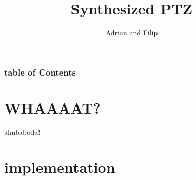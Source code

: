 \documentclass[9pt]{beamer}
\title{Synthesized PTZ}
\author{Adrian and Filip}
\begin{document}
\maketitle
\begin{frame}
	\frametitle{table of Contents}
	\tableofcontents
\end{frame}

\section{WHAAAAT?}
\begin{frame}
	ahubaboda!
\end{frame}

\section{implementation}
\end{document}
